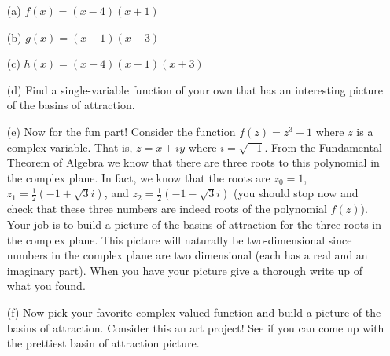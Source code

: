 \begin{enumerate}
    \item[(a)] $f(x) = (x-4)(x+1)$
    \item[(b)] $g(x) = (x-1)(x+3)$
    \item[(c)] $h(x) = (x-4)(x-1)(x+3)$
    \item[(d)] Find a single-variable function of your own that has an interesting
        picture of the basins of attraction.
    \item[(e)] Now for the fun part!  Consider the function $f(z) = z^3 - 1$ where $z$
        is a complex variable.  That is, $z = x + iy$ where $i = \sqrt{-1}$.  From the
        Fundamental Theorem of Algebra we know that there are three roots to this
        polynomial in the complex plane.  In fact, we know that the roots are $z_0 =
        1$, $z_1 = \frac{1}{2}\left( -1 + \sqrt{3} i \right)$, and $z_2 =
        \frac{1}{2} \left( -1 - \sqrt{3} i \right)$ (you should stop now and check
        that these three numbers are indeed roots of the polynomial $f(z)$).  Your job
        is to build a picture of the basins of attraction for the three roots in the
        complex plane.  This picture will naturally be two-dimensional since numbers
        in the complex plane are two dimensional (each has a real and an imaginary
        part).  When you have your picture give a thorough write up of what you found.
    \item[(f)] Now pick your favorite complex-valued function and build a picture of
        the basins of attraction.  Consider this an art project!  See if you can come
        up with the prettiest basin of attraction picture.
\end{enumerate}






